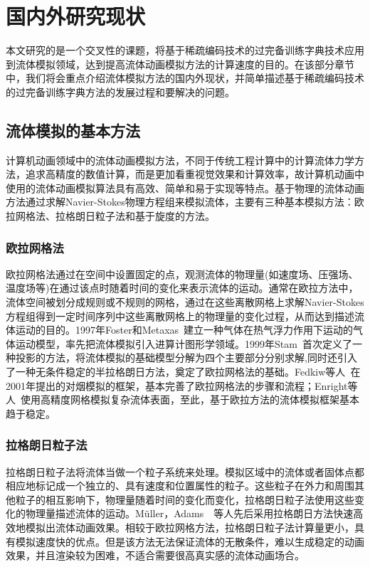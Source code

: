 \section{国内外研究现状}

本文研究的是一个交叉性的课题，将基于稀疏编码技术的过完备训练字典技术应用到流体模拟领域，达到提高流体动画模拟方法的计算速度的目的。在该部分章节中，我们将会重点介绍流体模拟方法的国内外现状，并简单描述基于稀疏编码技术的过完备训练字典方法的发展过程和要解决的问题。

\subsection{流体模拟的基本方法}
\label{sec:basicMethod}
 计算机动画领域中的流体动画模拟方法，不同于传统工程计算中的计算流体力学方法，追求高精度的数值计算，而是更加看重视觉效果和计算效率，故计算机动画中使用的流体动画模拟算法具有高效、简单和易于实现等特点。基于物理的流体动画方法通过求解Navier-Stokes物理方程组来模拟流体，主要有三种基本模拟方法：欧拉网格法、拉格朗日粒子法和基于旋度的方法。
 
 \subsubsection{欧拉网格法}
\label{sec:Euler}

欧拉网格法通过在空间中设置固定的点，观测流体的物理量(如速度场、压强场、温度场等)在通过该点时随着时间的变化来表示流体的运动。通常在欧拉方法中，流体空间被划分成规则或不规则的网格，通过在这些离散网格上求解Navier-Stokes方程组得到一定时间序列中这些离散网格上的物理量的变化过程，从而达到描述流体运动的目的。1997年Foster和Metaxas~\cite{foster1997modeling}建立一种气体在热气浮力作用下运动的气体运动模型，率先把流体模拟引入进算计图形学领域。1999年Stam~\cite{stam1999stable}首次定义了一种投影的方法，将流体模拟的基础模型分解为四个主要部分分别求解,同时还引入了一种无条件稳定的半拉格朗日方法，奠定了欧拉网格法的基础。Fedkiw等人~\cite{fedkiw2001visual}在2001年提出的对烟模拟的框架，基本完善了欧拉网格法的步骤和流程；Enright等人~\cite{enright2002animation}使用高精度网格模拟复杂流体表面，至此，基于欧拉方法的流体模拟框架基本趋于稳定。

 \subsubsection{拉格朗日粒子法}
\label{sec:Lagrangian}

拉格朗日粒子法将流体当做一个粒子系统来处理。模拟区域中的流体或者固体点都相应地标记成一个独立的、具有速度和位置属性的粒子。这些粒子在外力和周围其他粒子的相互影响下，物理量随着时间的变化而变化，拉格朗日粒子法使用这些变化的物理量描述流体的运动。M{\"u}ller，Adams~\cite{muller2003particle}~\cite{adams2007adaptively}等人先后采用拉格朗日方法快速高效地模拟出流体动画效果。相较于欧拉网格方法，拉格朗日粒子法计算量更小，具有模拟速度快的优点。但是该方法无法保证流体的无散条件，难以生成稳定的动画效果，并且渲染较为困难，不适合需要很高真实感的流体动画场合。

